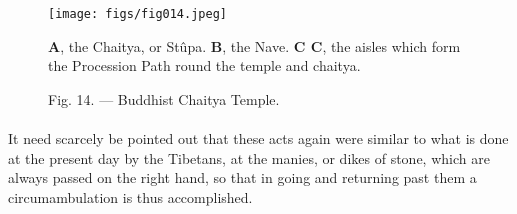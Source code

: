 \documentclass[a4paper, 11pt, oneside, polutonikogreek, english]{article}
\begin{document}
\begin{figure}[H]
\centering
\texttt{[image: figs/fig014.jpeg]}
\caption{Fig. 14. --- Buddhist Chaitya Temple.}

\textbf{A}, the Chaitya, or Stûpa. \textbf{B}, the Nave. \textbf{C C}, the aisles which form the Procession Path round the temple and chaitya.
\end{figure}
\paragraph{}
It need scarcely be pointed out that these acts again were similar to what is done at the present day by the Tibetans, at the manies, or dikes of stone, which are always passed on the right hand, so that in going and returning past them a circumambulation is thus accomplished.
\end{document}
